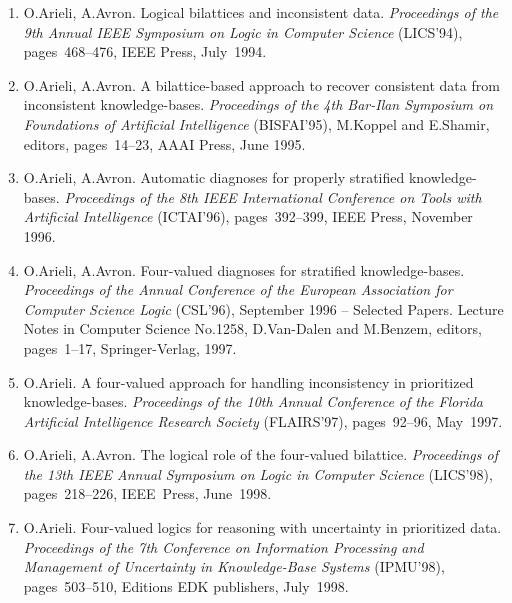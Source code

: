 \documentclass{article}
\begin{document}
\begin{enumerate}

   \item O.Arieli, A.Avron.
         Logical bilattices and inconsistent data. {\em Proceedings of the 9th Annual
         IEEE Symposium on Logic in Computer Science\/} (LICS'94), pages~468--476,
         IEEE Press, July~1994.

   \item O.Arieli, A.Avron.
         A bilattice-based approach to recover consistent data from
         inconsistent knowledge-bases. {\em Proceedings of the 4th Bar-Ilan Symposium on
         Foundations of Artificial Intelligence\/} (BISFAI'95),
         M.Koppel and E.Shamir, editors, pages~14--23, AAAI Press, June 1995.

   \item O.Arieli, A.Avron.
         Automatic diagnoses for properly stratified knowledge-bases.
         {\em Proceedings of the 8th IEEE International Conference on Tools with
         Artificial Intelligence\/} (ICTAI'96), pages~392--399, IEEE Press,
         November 1996.

   \item O.Arieli, A.Avron.
         Four-valued diagnoses for stratified knowledge-bases.
         {\em Proceedings of the Annual Conference of the European Association for
         Computer Science Logic\/} (CSL'96), September 1996 -- Selected Papers.
         Lecture Notes in Computer Science No.1258, D.Van-Dalen and M.Benzem,
         editors, pages~1--17, Springer-Verlag, 1997.

   \item O.Arieli.
         A four-valued approach for handling inconsistency in prioritized
         knowledge-bases. {\em Proceedings of the 10th Annual Conference of
         the Florida Artificial Intelligence Research Society\/}
         (FLAIRS'97), pages~92--96, May~1997.

   \item O.Arieli, A.Avron.
         The logical role of the four-valued bilattice.
         {\em Proceedings of the 13th IEEE Annual Symposium on Logic in Computer
         Science\/} (LICS'98), pages~218--226, IEEE~Press, June~1998.

   \item O.Arieli.
         Four-valued logics for reasoning with uncertainty in prioritized
         data. {\em Proceedings of the 7th Conference on Information Processing
         and Management of Uncertainty in Knowledge-Base Systems\/}
         (IPMU'98), pages~503--510, Editions EDK publishers, July~1998.


\end{enumerate}
\end{document}
